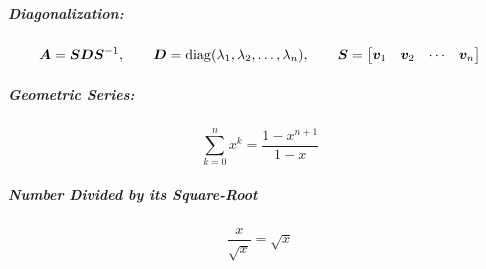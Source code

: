 \subparagraph{Diagonalization:}
\begin{equation}
	\bm{A} = \bm{S} \bm{D} \bm{S}^{-1},\qquad
	\bm{D} = \operatorname{diag}(\lambda_1, \lambda_2, \dots, \lambda_n),\qquad
	\bm{S} = \begin{bmatrix} \bm{v}_1 & \bm{v}_2 & \cdots & \bm{v}_n \end{bmatrix}
\end{equation}

\subparagraph{Geometric Series:}
	\begin{equation}
		\sum_{k = 0}^{n} x^k = \frac{1 - x^{n + 1}}{1 - x}
	\end{equation}

	\subparagraph{Number Divided by its Square-Root}
		\begin{equation}
			\frac{x}{\sqrt{x}} = \sqrt{x}
		\end{equation}

